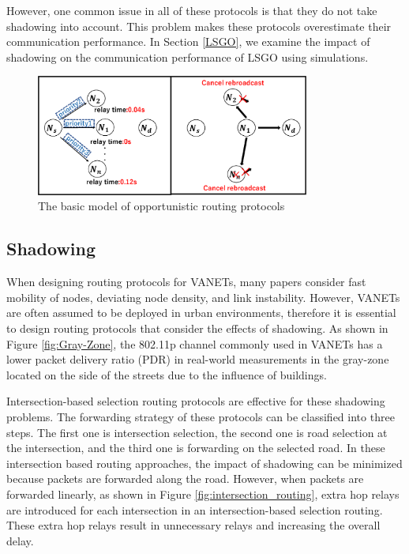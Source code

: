 \documentclass[conference]{IEEEtran}
\begin{document}
However, one  common issue in all of these protocols is that they do not take shadowing into account.
This problem makes these protocols overestimate their communication performance. In Section \ref{LSGO}, we examine the impact of shadowing on the communication performance of LSGO using simulations. 

\begin{figure}[!ht]
\centering
\includegraphics[width=90mm]{figures/basic-opportunity2.eps}
\caption{The basic model of opportunistic routing protocols}
\label{fig:Basic}
\end{figure}

\subsection{Shadowing}
When designing routing protocols for VANETs, many papers consider fast mobility of nodes, deviating node density, and link instability. 
However, VANETs are often assumed to be deployed in urban environments, therefore it is essential to design routing protocols that consider the effects of shadowing.  
As shown in Figure \ref{fig:Gray-Zone}, the 802.11p channel commonly used in VANETs has a lower packet delivery ratio (PDR) in real-world measurements in the gray-zone \cite{17} located on the side of the streets due to the influence of buildings.

Intersection-based selection routing protocols \cite{24,25,26}  are effective for these shadowing problems.
The forwarding strategy of these protocols can be classified into three steps. The first one is intersection selection, the second one is road selection at the intersection, and the third one is forwarding on the selected road. 
In these intersection based routing approaches, the impact of shadowing can be minimized because packets are forwarded along the road.
However, when packets are forwarded linearly,  as shown in Figure \ref{fig:intersection_routing}, extra hop relays are introduced for each intersection in an intersection-based selection routing. These extra hop relays result in unnecessary relays and increasing the overall delay.
\end{document}
